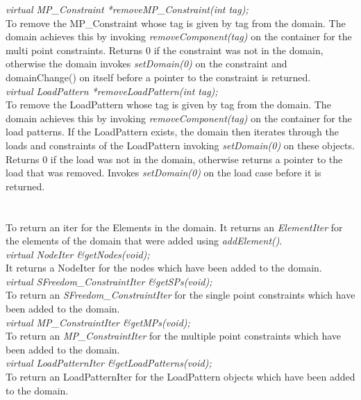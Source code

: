 {{\em virtual MP\_Constraint *removeMP\_Constraint(int tag);} \\
To remove the MP\_Constraint whose tag is given by \p tag from the
domain. The domain achieves this by invoking {\em
removeComponent(tag)} on the container for the multi point
constraints. Returns $0$ if the constraint was not in the domain,
otherwise the domain invokes {\em setDomain(0)} on the constraint and
domainChange() on itself before a pointer to the constraint is
returned.\\   

{\em virtual LoadPattern *removeLoadPattern(int tag);}\\         
To remove the LoadPattern whose tag is given by \p tag from the
domain. The domain achieves this by invoking {\em
removeComponent(tag)} on the container for the load patterns. 
If the LoadPattern exists, the domain then iterates through the loads
and constraints of the LoadPattern invoking {\em setDomain(0)} on
these objects. Returns
$0$ if the load was not in the domain, otherwise returns a pointer to
the load that was removed. Invokes {\em setDomain(0)} on the load case
before it is returned.\\ 


  \\
 \\
To return an iter for the Elements in the domain. It returns an {\em
ElementIter} for the elements of the domain that were added using {\em
addElement()}. \\  

{\em virtual NodeIter \&getNodes(void);} \\
It returns a \p NodeIter for the nodes which have been added to the
domain. \\ 

{\em virtual SFreedom\_ConstraintIter \&getSPs(void);} \\
To return an {\em SFreedom\_ConstraintIter} for the single point constraints
which have been added to the domain. \\ 

{\em virtual MP\_ConstraintIter \&getMPs(void);} \\
To return an {\em MP\_ConstraintIter} for the multiple point
constraints which have been added to the domain. \\ 

{\em virtual LoadPatternIter \&getLoadPatterns(void);} \\
To return an \p LoadPatternIter for the LoadPattern
objects which have been added to the domain. \\ 

}
